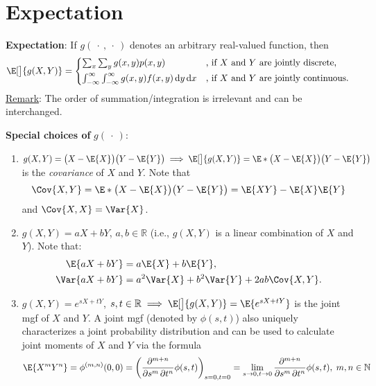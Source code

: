 \section*{Expectation}
\begin{Regular}
    \textbf{Expectation}: If $ g(\:\cdot\:,\:\cdot\:) $ denotes an arbitrary real-valued function, then
    \[ \E[\big]{g(X,Y)}=\begin{cases*}
            \sum_x\sum_y g(x,y)p(x,y)                                            & , if $ X $ and $ Y $ are jointly discrete,   \\
            \int_{-\infty}^{\infty}\int_{-\infty}^{\infty}g(x,y)f(x,y)\odif{y,x} & , if $ X $ and $ Y $ are jointly continuous.
        \end{cases*} \]
    \tcblower{}
    \underline{Remark}: The order of summation/integration is irrelevant and can be interchanged.
\end{Regular}
\begin{Regular}
    \textbf{Special choices of} $ g(\:\cdot\:) $:
    \begin{enumerate}[1.]
        \item $ g(X,Y)=\bigl(X-\E{X}\bigr)\bigl(Y-\E{Y}\bigr)\implies\E[\big]{g(X,Y)}=\E*{\bigl(X-\E{X}\bigr)\bigl(Y-\E{Y}\bigr)} $
              is the \emph{covariance} of $ X $ and $ Y $. Note that
              \[ \Cov{X,Y}=\E*{\bigl(X-\E{X}\bigr)\bigl(Y-\E{Y}\bigr)}=\E{XY}-\E{X}\E{Y} \]
              and $ \Cov{X,X}=\Var{X} $.
        \item $ g(X,Y)=aX+bY $, $ a,b\in\mathbb{R} $ (i.e., $ g(X,Y) $ is a linear combination of $ X $ and $ Y $). Note that:
              \begin{align*}
                  \E{aX+bY}   & =a\E{X}+b\E{Y},                      \\
                  \Var{aX+bY} & =a^2\Var{X}+b^2\Var{Y}+2ab\Cov{X,Y}.
              \end{align*}
        \item $ g(X,Y)=e^{sX+tY} $, $ s,t\in\mathbb{R}\implies \E[\big]{g(X,Y)}=\E{e^{sX+tY}} $ is the joint mgf of $ X $ and $ Y $.
              A joint mgf (denoted by $ \phi(s,t) $) also uniquely characterizes a joint probability distribution
              and can be used to calculate joint moments of $ X $ and $ Y $ via the formula
              \[ \E{X^m Y^n}=\phi^{(m,n)}(0,0)=\pdv*[order={m,n}]{\phi(s,t)}{s,t}_{s=0,t=0}=
                  \lim\limits_{s\to 0,t\to 0}\pdv*[order={m,n}]{\phi(s,t)}{s,t},\; m,n\in\mathbb{N}  \]
    \end{enumerate}
\end{Regular}
